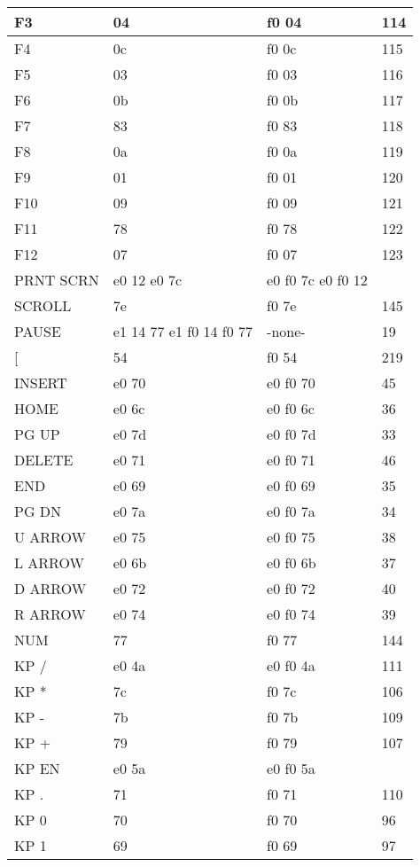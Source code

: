 \begin{longtable}{| p{} | p{} | p{} | p{} |}
  F3 & 04 & f0 04 & 114 \\ \hline
  F4 & 0c & f0 0c & 115 \\ \hline
  F5 & 03 & f0 03 & 116 \\ \hline
  F6 & 0b & f0 0b & 117 \\ \hline
  F7 & 83 & f0 83 & 118 \\ \hline
  F8 & 0a & f0 0a & 119 \\ \hline
  F9 & 01 & f0 01 & 120 \\ \hline
  F10 & 09 & f0 09 & 121 \\ \hline
  F11 & 78 & f0 78 & 122 \\ \hline
  F12 & 07 & f0 07 & 123 \\ \hline
  PRNT SCRN & e0 12 e0 7c & e0 f0 7c e0 f0 12 &  \\ \hline
  SCROLL & 7e & f0 7e & 145 \\ \hline
  PAUSE & e1 14 77 e1 f0 14 f0 77 & -none- & 19 \\ \hline
  [ & 54 & f0 54 & 219 \\ \hline
  INSERT & e0 70 & e0 f0 70 & 45 \\ \hline
  HOME & e0 6c & e0 f0 6c & 36 \\ \hline
  PG UP & e0 7d & e0 f0 7d & 33 \\ \hline
  DELETE & e0 71 & e0 f0 71 & 46 \\ \hline
  END & e0 69 & e0 f0 69 & 35 \\ \hline
  PG DN & e0 7a & e0 f0 7a & 34 \\ \hline
  U ARROW & e0 75 & e0 f0 75 & 38 \\ \hline
  L ARROW & e0 6b & e0 f0 6b & 37 \\ \hline
  D ARROW & e0 72 & e0 f0 72 & 40 \\ \hline
  R ARROW & e0 74 & e0 f0 74 & 39 \\ \hline
  NUM & 77 & f0 77 & 144 \\ \hline
  KP / & e0 4a & e0 f0 4a & 111 \\ \hline
  KP * & 7c & f0 7c & 106 \\ \hline
  KP - & 7b & f0 7b & 109 \\ \hline
  KP + & 79 & f0 79 & 107 \\ \hline
  KP EN & e0 5a & e0 f0 5a &  \\ \hline
  KP . & 71 & f0 71 & 110 \\ \hline
  KP 0 & 70 & f0 70 & 96 \\ \hline
  KP 1 & 69 & f0 69 & 97 \\ \hline

\end{longtable}
